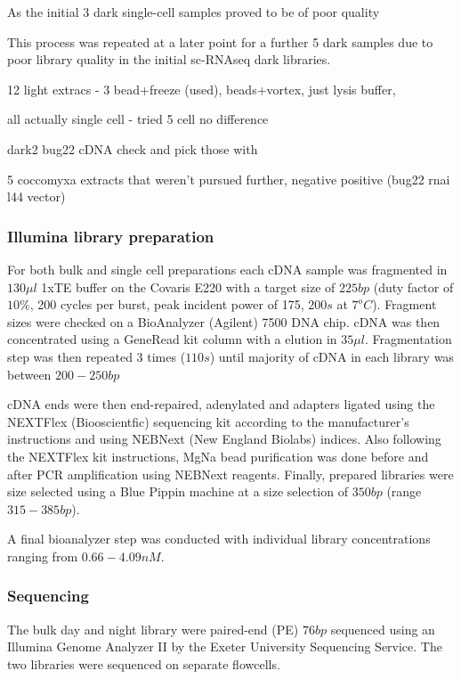 As the initial 3 dark single-cell samples proved to be of poor quality 




This process was repeated at a later point for a further 5 dark samples due to poor library quality in
the initial sc-RNAseq dark libraries. 


12 light extracs - 3 bead+freeze (used),    beads+vortex, just lysis buffer, 

all actually single cell - tried 5 cell no difference

dark2 bug22 cDNA check and pick those with

5 coccomyxa extracts that weren't pursued further, negative positive (bug22 rnai l44 vector)


\subsubsection{Illumina library preparation}

For both bulk and single cell preparations each cDNA sample was fragmented in \(130\mu l\) 1xTE buffer on the Covaris E220 
with a target size of \(225bp\) (duty factor of \(10\%\), 200 cycles per burst, peak incident power
of 175, \(200s\) at \(7^{o}C\)). Fragment sizes were checked on a BioAnalyzer (Agilent) 7500 DNA chip.
cDNA was then concentrated using a GeneRead kit column with a elution in \(35\mu l\). Fragmentation
step was then repeated 3 times (\(110s\)) until majority of cDNA in each library was between \(200-250bp\)

cDNA ends were then end-repaired, adenylated and adapters ligated using the NEXTFlex (Biooscientfic) sequencing kit 
according to the manufacturer's instructions and using NEBNext (New England Biolabs) indices.  Also following
the NEXTFlex kit instructions, MgNa bead purification was done before and after PCR amplification using
NEBNext reagents.  Finally, prepared libraries were size selected using a Blue Pippin machine at a size selection
of \(350bp\) (range \(315-385bp\)).

A final bioanalyzer step was conducted with individual library concentrations ranging from \(0.66-4.09nM\).


\subsubsection{Sequencing}

The bulk day and night library were paired-end (PE) \(76bp\) sequenced using an Illumina Genome
Analyzer II by the Exeter University Sequencing Service.  The two libraries were sequenced
on separate flowcells.

